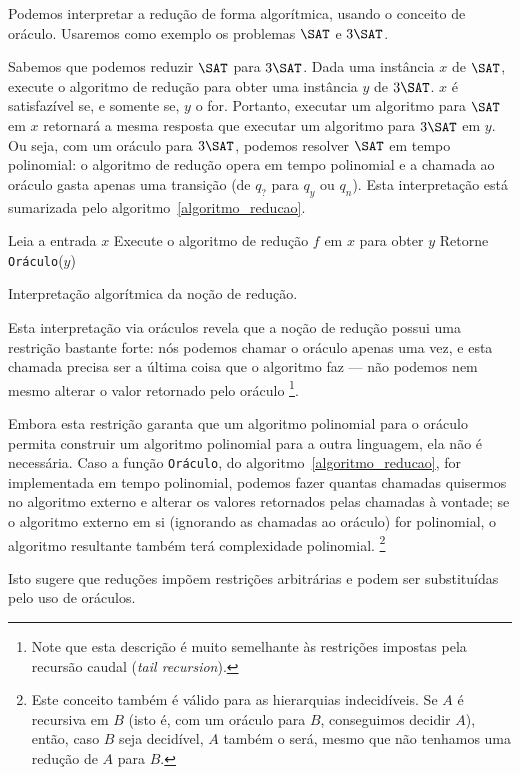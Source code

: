 Podemos interpretar a redução de forma algorítmica,
usando o conceito de oráculo.
Usaremos como exemplo os problemas $\SAT$ e $3\SAT$.

Sabemos que podemos reduzir $\SAT$ para $3\SAT$.
Dada uma instância $x$ de $\SAT$,
execute o algoritmo de redução para obter uma instância $y$ de $3\SAT$.
$x$ é satisfazível se, e somente se, $y$ o for.
Portanto, executar um algoritmo para $\SAT$ em $x$
retornará a mesma resposta
que executar um algoritmo para $3\SAT$ em $y$.
Ou seja, com um oráculo para $3\SAT$,
podemos resolver $\SAT$ em tempo polinomial:
o algoritmo de redução opera em tempo polinomial
e a chamada ao oráculo gasta apenas uma transição
(de $q_?$ para $q_y$ ou $q_n$).
Esta interpretação está sumarizada pelo algoritmo~\ref{algoritmo_reducao}.

\begin{algorithm}[h]
    Leia a entrada $x$\;
    Execute o algoritmo de redução $f$ em $x$ para obter $y$\;
    Retorne \texttt{Oráculo}($y$)\;
    \caption{
        Interpretação algorítmica da noção de redução.
    }
    \label{algoritmo_reducao}
\end{algorithm}

Esta interpretação via oráculos revela que
a noção de redução possui uma restrição bastante forte:
nós podemos chamar o oráculo apenas uma vez,
e esta chamada precisa ser a última coisa que o algoritmo faz
--- não podemos nem mesmo alterar o valor retornado pelo oráculo%
\footnote{
    Note que esta descrição é muito semelhante
    às restrições impostas pela recursão caudal
    (\emph{tail recursion}).
}.

Embora esta restrição garanta que
um algoritmo polinomial para o oráculo
permita construir um algoritmo polinomial para a outra linguagem,
ela não é necessária.
Caso a função \texttt{Oráculo}, do algoritmo~\ref{algoritmo_reducao},
for implementada em tempo polinomial,
podemos fazer quantas chamadas quisermos no algoritmo externo
e alterar os valores retornados pelas chamadas à vontade;
se o algoritmo externo em si
(ignorando as chamadas ao oráculo)
for polinomial,
o algoritmo resultante também terá complexidade polinomial.
\footnote{
    Este conceito também é válido para as hierarquias indecidíveis.
    Se $A$ é recursiva em $B$
    (isto é, com um oráculo para $B$, conseguimos decidir $A$),
    então, caso $B$ seja decidível,
    $A$ também o será,
    mesmo que não tenhamos uma redução de $A$ para $B$.
}

Isto sugere que reduções impõem restrições arbitrárias
e podem ser substituídas pelo uso de oráculos.
